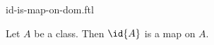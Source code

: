 \documentclass{stex}
\begin{document}
\begin{smodule}{id-is-map-on-dom.ftl}


\begin{proposition}[forthel,id=IdFromToProp]
  Let $A$ be a class.
  Then $\id{A}$ is a map on $A$.
\end{proposition}

\end{smodule}
\end{document}
